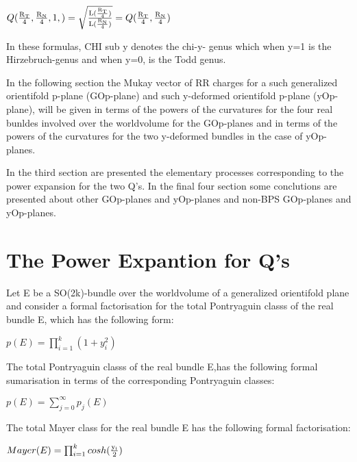 \documentclass[a4paper,a4paper]{article}
\begin{document}
\begin{center}
{  $ Q(\frac{\rm R_T}{\rm 4},\frac{\rm R_N}{\rm 4},1,) =\sqrt{\frac{\rm L(\frac{\rm R_T}{\rm 4})}{\rm L(\frac{\rm R_N}{\rm 4})}}=Q(\frac{\rm R_T}{\rm 4},\frac{\rm R_N}{\rm 4}) $ }
\end{center}
In these formulas, CHI sub y  denotes the chi-y- genus which when y=1 is the Hirzebruch-genus and when y=0, is the Todd genus.


In the following section the Mukay vector of RR charges for a such generalized orientifold p-plane (GOp-plane) and such y-deformed orientifold p-plane (yOp-plane), will be given in terms of the powers of the curvatures for the four real bunldes involved over the worldvolume   for the GOp-planes and in terms of the powers of the curvatures for the two y-deformed bundles in the case of yOp-planes.


 




 In the third section are presented the elementary processes corresponding to the power expansion for the two Q's. In the final four section some conclutions are presented about other GOp-planes and yOp-planes  and non-BPS GOp-planes and yOp-planes.

\section{The Power Expantion for Q's}

Let E be a SO(2k)-bundle over the worldvolume of a generalized orientifold plane and consider a formal factorisation for the total Pontryaguin classs of the real bundle E, which has the following form:

\begin{center}
{  $ p(E) = \prod_{i=1}^k(1+y_i^2)$ }
\end{center}
The total Pontryaguin classs of the real bundle E,has the following formal sumarisation in terms of the corresponding Pontryaguin classes: 
\begin{center}
{  $ p(E) = \sum_{j=0}^{\infty}p_j(E) $ }
\end{center}
The total Mayer class for the real bundle E has the following formal factorisation:
\begin{center}
{  $ Mayer(E) = \prod_{i=1}^kcosh(\frac{\rm y_i}{\rm 2})$ }
\end{center}
\end{document}
